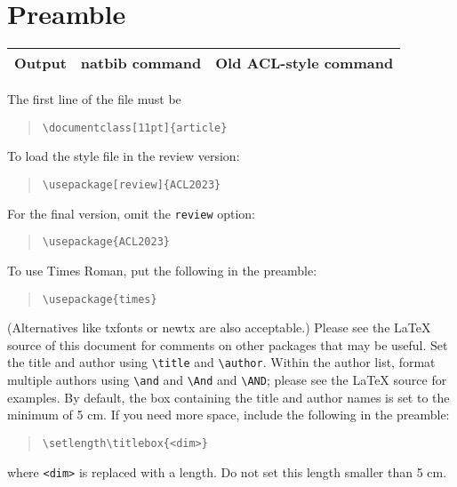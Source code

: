 \documentclass[11pt]{article}
\begin{document}
\section{Preamble}
\begin{table*}
\centering
\begin{tabular}{lll}
\hline
\textbf{Output} & \textbf{natbib command} & \textbf{Old ACL-style command}\\
\hline
\hline
\end{tabular}
\caption{\label{citation-guide}
Citation commands supported by the style file.
The style is based on the natbib package and supports all natbib citation commands.
It also supports commands defined in previous ACL style files for compatibility.
}
\end{table*}
The first line of the file must be
\begin{quote}
\begin{verbatim}
\documentclass[11pt]{article}
\end{verbatim}
\end{quote}
To load the style file in the review version:
\begin{quote}
\begin{verbatim}
\usepackage[review]{ACL2023}
\end{verbatim}
\end{quote}
For the final version, omit the \verb|review| option:
\begin{quote}
\begin{verbatim}
\usepackage{ACL2023}
\end{verbatim}
\end{quote}
To use Times Roman, put the following in the preamble:
\begin{quote}
\begin{verbatim}
\usepackage{times}
\end{verbatim}
\end{quote}
(Alternatives like txfonts or newtx are also acceptable.)
Please see the \LaTeX{} source of this document for comments on other packages that may be useful.
Set the title and author using \verb|\title| and \verb|\author|. Within the author list, format multiple authors using \verb|\and| and \verb|\And| and \verb|\AND|; please see the \LaTeX{} source for examples.
By default, the box containing the title and author names is set to the minimum of 5 cm. If you need more space, include the following in the preamble:
\begin{quote}
\begin{verbatim}
\setlength\titlebox{<dim>}
\end{verbatim}
\end{quote}
where \verb|<dim>| is replaced with a length. Do not set this length smaller than 5 cm.
\end{document}

